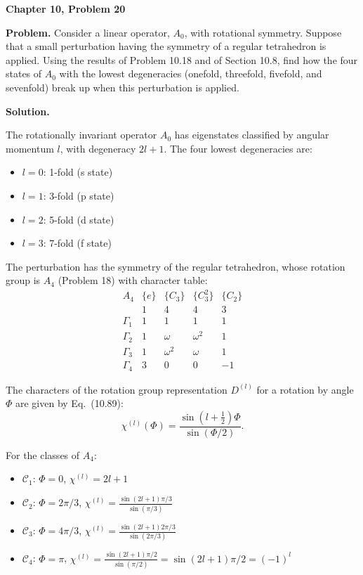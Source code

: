 \documentclass[12pt]{article}
\begin{document}
\begin{center}
{\Large\bfseries Chapter 10, Problem 20}
\end{center}

\noindent\textbf{Problem.} Consider a linear operator, $A_0$, with rotational symmetry. Suppose that a small perturbation having the symmetry of a regular tetrahedron is applied. Using the results of Problem 10.18 and of Section 10.8, find how the four states of $A_0$ with the lowest degeneracies (onefold, threefold, fivefold, and sevenfold) break up when this perturbation is applied.

\bigskip
\noindent\textbf{Solution.}

The rotationally invariant operator $A_0$ has eigenstates classified by angular momentum $l$, with degeneracy $2l+1$. The four lowest degeneracies are:
\begin{itemize}
\item $l = 0$: 1-fold (s state)
\item $l = 1$: 3-fold (p state)
\item $l = 2$: 5-fold (d state)
\item $l = 3$: 7-fold (f state)
\end{itemize}

The perturbation has the symmetry of the regular tetrahedron, whose rotation group is $A_4$ (Problem 18) with character table:
\[
\begin{array}{c|cccc}
A_4 & \{e\} & \{C_3\} & \{C_3^2\} & \{C_2\} \\
& 1 & 4 & 4 & 3 \\
\hline
\Gamma_1 & 1 & 1 & 1 & 1 \\
\Gamma_2 & 1 & \omega & \omega^2 & 1 \\
\Gamma_3 & 1 & \omega^2 & \omega & 1 \\
\Gamma_4 & 3 & 0 & 0 & -1
\end{array}
\]

The characters of the rotation group representation $D^{(l)}$ for a rotation by angle $\Phi$ are given by Eq.~(10.89):
\[
\chi^{(l)}(\Phi) = \frac{\sin(l + \tfrac{1}{2})\Phi}{\sin(\Phi/2)}.
\]

For the classes of $A_4$:
\begin{itemize}
\item $\mathcal{C}_1$: $\Phi = 0$, $\chi^{(l)} = 2l+1$
\item $\mathcal{C}_2$: $\Phi = 2\pi/3$, $\chi^{(l)} = \frac{\sin(2l+1)\pi/3}{\sin(\pi/3)}$
\item $\mathcal{C}_3$: $\Phi = 4\pi/3$, $\chi^{(l)} = \frac{\sin(2l+1)2\pi/3}{\sin(2\pi/3)}$
\item $\mathcal{C}_4$: $\Phi = \pi$, $\chi^{(l)} = \frac{\sin(2l+1)\pi/2}{\sin(\pi/2)} = \sin(2l+1)\pi/2 = (-1)^l$
\end{itemize}
\end{document}
